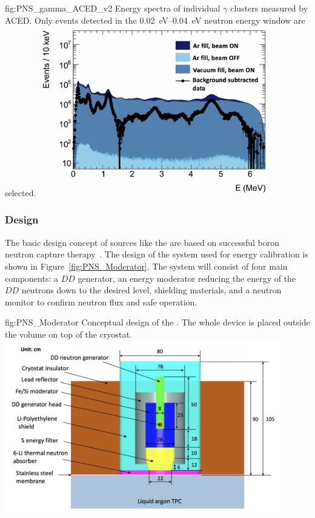 \begin{dunefigure}{fig:PNS_gamma_ACED_v2}
{Energy spectra of individual $\gamma$ clusters measured by ACED. Only events detected in the \SIrange{0.02}{0.04}{eV} neutron energy window are selected.}
\includegraphics[width=10cm]{graphics/PNS_gamma_ACED_v2.png}
\end{dunefigure}


\subsubsection{Design}
\label{sec:sp-calib-sys-pns-des}

The basic design concept of sources like the  are based on successful boron neutron capture therapy~\cite{bib:Koivunoro2004}. The design of the  system used for energy calibration is shown in Figure~\ref{fig:PNS_Moderator}. The system will consist of four main components: a $DD$ generator, an energy moderator reducing the energy of the $DD$ neutrons down to the desired level, shielding materials, and a neutron monitor to confirm neutron flux and safe operation. 

\begin{dunefigure}{fig:PNS_Moderator}
{Conceptual design of the . The whole device is placed outside the  volume on top of the cryostat.}
\includegraphics[width=12cm]{graphics/PNS_Moderator.png}
\end{dunefigure}

